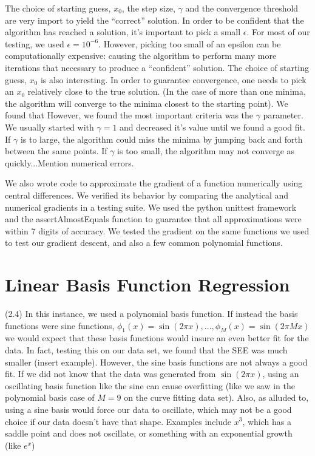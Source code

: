 \documentclass{article}
\begin{document}
The choice of starting guess, $x_0$, the step size, $\gamma$ and the convergence threshold are very import to yield the ``correct'' solution.  In order to be confident that the algorithm has reached a solution, it's important to pick a small $\epsilon$.  For most of our testing, we used $\epsilon = 10^{-6}$.  However, picking too small of an epsilon can be computationally expensive: causing the algorithm to perform many more iterations that necessary to produce a ``confident'' solution.  The choice of starting guess, $x_0$ is also interesting.  In order to guarantee convergence, one needs to pick an $x_0$ relatively close to the true solution.  (In the case of more than one minima, the algorithm will converge to the minima closest to the starting point).  We found that However, we found the most important criteria was the $\gamma$ parameter.  We usually started with $\gamma=1$ and decreased it's value until we found a good fit.  If $\gamma$ is to large, the algorithm could miss the minima by jumping back and forth between the same points.  If $\gamma$ is too small, the algorithm may not converge as quickly...Mention numerical errors.  

We also wrote code to approximate the gradient of a function numerically using central differences.  We verified its behavior by comparing the analytical and numerical gradients in a testing suite.  We used the python unittest framework and the assertAlmostEquals function to guarantee that all approximations were within 7 digits of accuracy.  We tested the gradient on the same functions we used to test our gradient descent, and also a few common polynomial functions. 



\section{Linear Basis Function Regression}

(2.4) In this instance, we used a polynomial basis function.  If instead the basis functions were sine functions, $\phi_1(x)=\sin(2\pi x),...,\phi_M(x)=\sin(2\pi Mx)$ we would expect that these basis functions would insure an even better fit for the data.  In fact, testing this on our data set, we found that the SEE was much smaller (insert example).  However, the sine basis functions are not always a good fit.  If we did not know that the data was generated from $\sin(2\pi x)$, using an oscillating basis function like the sine can cause overfitting (like we saw in the polynomial basis case of $M=9$ on the curve fitting data set).  Also, as alluded to, using a sine basis would force our data to oscillate, which may not be a good choice if our data doesn't have that shape.  Examples include $x^3$, which has a saddle point and does not oscillate, or something with an exponential growth (like $e^x$)
\end{document}
